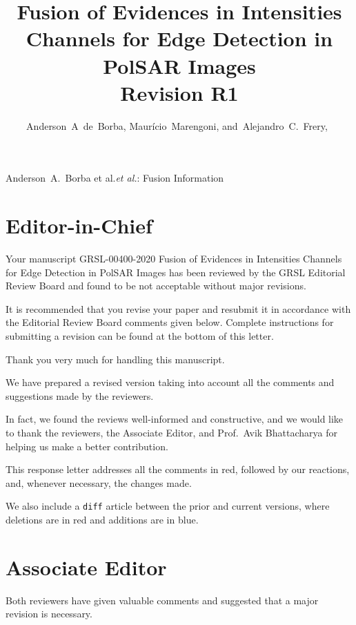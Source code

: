 \documentclass[journal,onecolumn,draftcls,11pt]{IEEEtran}
\begin{document}
\title{Fusion of Evidences in Intensities Channels for Edge Detection in PolSAR Images\\
	Revision R1}

\author{Anderson~A~de~Borba,
	Maurício~Marengoni,
	and~Alejandro~C.~Frery,~}

%
{Anderson~A.\ Borba et al.\MakeLowercase{\textit{et al.}}: Fusion Information}

\maketitle

\IEEEpeerreviewmaketitle

\section{Editor-in-Chief}
\begin{tcolorbox}[colback=red!5!white,colframe=red!75!black,title=Comment \#1]
Your manuscript GRSL-00400-2020 Fusion of Evidences in Intensities Channels for Edge Detection in PolSAR Images has been reviewed by the GRSL  Editorial Review Board and found to be not acceptable without  major revisions.

It is recommended that you revise your paper and resubmit it in  accordance with the Editorial Review Board comments given below.   Complete instructions for submitting a revision can be found at the bottom of this letter.
\end{tcolorbox}

Thank you very much for handling this manuscript.

We have prepared a revised version taking into account all the comments and suggestions made by the reviewers.

In fact, we found the reviews well-informed and constructive, and we would like to thank the reviewers, the Associate Editor, and Prof.\ Avik Bhattacharya for helping us make a better contribution.

This response letter addresses all the comments in red, followed by
our reactions, and, whenever necessary, the changes made.

We also include a \texttt{diff} article between the prior and current versions, where deletions are in red and additions are in blue.

\section{Associate Editor}
\begin{tcolorbox}[colback=red!5!white,colframe=red!75!black,title=Comment \#1]
Both reviewers have given valuable comments and suggested that a major revision is necessary.
\end{tcolorbox}
\end{document}
